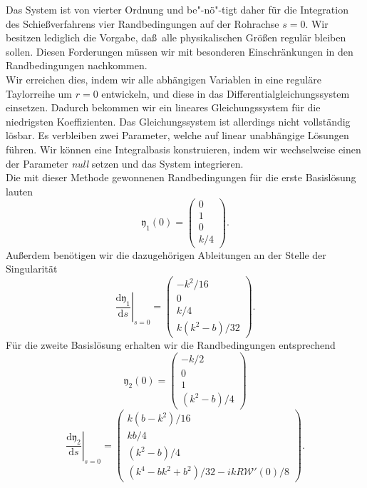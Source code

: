 \documentclass[10pt,a5paper,oneside,draft]{book}
\numberwithin{equation}{chapter}
\begin{document}
Das System ist von vierter Ordnung und be"-n\"o"-tigt daher f\"ur die Integration des Schie\ss verfahrens vier Randbedingungen auf der Rohrachse $s=0$.
Wir besitzen lediglich die Vorgabe, da\ss\ alle physikalischen Gr\"o\ss en regul\"ar bleiben sollen.
Diesen Forderungen m\"ussen wir mit besonderen Einschr\"ankungen in den Randbedingungen nachkommen.\\
Wir erreichen dies, indem wir alle abh\"angigen Variablen in eine regul\"are Taylorreihe um $r=0$ entwickeln, und diese in das Differentialgleichungssystem einsetzen.
Dadurch bekommen wir ein lineares Gleichungssystem f\"ur die niedrigsten Koeffizienten.
Das Gleichungssystem ist allerdings nicht vollst\"andig l\"osbar.
Es verbleiben zwei Parameter, welche auf linear unabh\"angige L\"osungen f\"uhren.
Wir k\"onnen eine Integralbasis konstruieren, indem wir wechselweise einen der Parameter \textit{null} setzen und das System integrieren.\\
Die mit dieser Methode gewonnenen Randbedingungen f\"ur die erste Basisl\"osung lauten
\begin{equation}\label{eq:shoot:ab1}
	\mathfrak{y}_1(0) = \left( \begin{array}{c}
		0 \\
		1 \\
		0 \\
		k/4
	\end{array} \right).
\end{equation}
Au\ss erdem ben\"otigen wir die dazugeh\"origen Ableitungen an der Stelle der Singularit\"at
\begin{equation}\label{eq:shoot:sin1}
	\left.\frac{\mathrm{d} \mathfrak{y}_1}{\mathrm{d} s}\right|_{s=0} = \left( \begin{array}{c}
		-k^2/16 \\
		0 \\
		k/4 \\
		k(k^2-b)/32
	\end{array} \right).
\end{equation}
F\"ur die zweite Basisl\"osung erhalten wir die Randbedingungen entsprechend
\begin{equation}\label{eq:shoot:ab2}
	\mathfrak{y}_2(0) = \left( \begin{array}{c}
		-k/2 \\
		0 \\
		1 \\
		(k^2-b)/4
	\end{array} \right)
\end{equation}
\begin{equation}\label{eq:shoot:sin2}
	\left.\frac{\mathrm{d} \mathfrak{y}_2}{\mathrm{d} s}\right|_{s=0} = \left( \begin{array}{c}
		k(b-k^2)/16 \\
		kb/4 \\
		(k^2-b)/4 \\
		(k^4-bk^2+b^2)/32-ikR\mathscr{W}'(0)/8
	\end{array} \right).
\end{equation}
\end{document}

